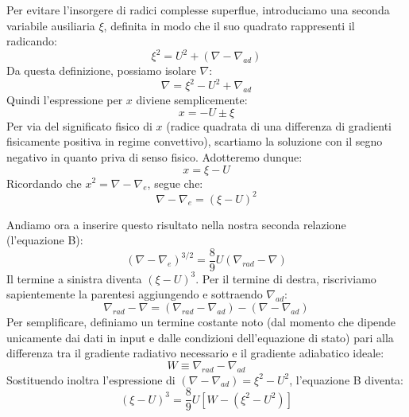 Per evitare l'insorgere di radici complesse superflue, introduciamo una seconda variabile ausiliaria $\xi$, definita in modo che il suo quadrato rappresenti il radicando:
\begin{equation}
\xi^2 = U^2 + (\nabla - \nabla_{ad})
\end{equation}
Da questa definizione, possiamo isolare $\nabla$:
\begin{equation}
\nabla = \xi^2 - U^2 + \nabla_{ad}
\end{equation}
Quindi l'espressione per $x$ diviene semplicemente:
\begin{equation}
x = -U \pm \xi
\end{equation}
Per via del significato fisico di $x$ (radice quadrata di una differenza di gradienti fisicamente positiva in regime convettivo), scartiamo la soluzione con il segno negativo in quanto priva di senso fisico. Adotteremo dunque:
\begin{equation}
x = \xi - U
\end{equation}
Ricordando che $x^2 = \nabla - \nabla_e$, segue che:
\begin{equation}
\nabla - \nabla_e = (\xi - U)^2
\end{equation}

Andiamo ora a inserire questo risultato nella nostra seconda relazione (l'equazione B):
\begin{equation}
(\nabla - \nabla_e)^{3/2} = \frac{8}{9} U (\nabla_{rad} - \nabla)
\end{equation}
Il termine a sinistra diventa $(\xi - U)^3$.
Per il termine di destra, riscriviamo sapientemente la parentesi aggiungendo e sottraendo $\nabla_{ad}$:
\begin{equation}
\nabla_{rad} - \nabla = (\nabla_{rad} - \nabla_{ad}) - (\nabla - \nabla_{ad})
\end{equation}
Per semplificare, definiamo un termine costante noto (dal momento che dipende unicamente dai dati in input e dalle condizioni dell'equazione di stato) pari alla differenza tra il gradiente radiativo necessario e il gradiente adiabatico ideale:
\begin{equation}
W \equiv \nabla_{rad} - \nabla_{ad}
\end{equation}
Sostituendo inoltra l'espressione di $(\nabla - \nabla_{ad}) = \xi^2 - U^2$, l'equazione B diventa:
\begin{equation}
(\xi - U)^3 = \frac{8}{9} U \left[ W - (\xi^2 - U^2) \right]
\end{equation}

